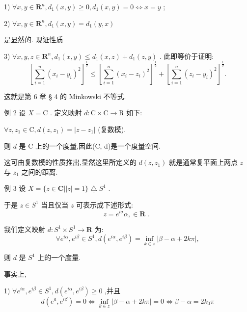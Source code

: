 1) $\forall x,y \in  {\mathbf{R}}^{n},{d}_{1}\left( {x,y}\right)  \geq  0,{d}_{1}\left( {x,y}\right)  = 0 \Leftrightarrow  x = y$ ;

2) $\forall x,y \in  {\mathbf{R}}^{n},{d}_{1}\left( {x,y}\right)  = {d}_{1}\left( {y,x}\right)$

是显然的. 现证性质

3) $\forall x,y,z \in  {\mathbf{R}}^{n},{d}_{1}\left( {x,y}\right)  \leq  {d}_{1}\left( {x,z}\right)  + {d}_{1}\left( {z,y}\right)$ . 此即等价于证明:
$${\left\lbrack  \mathop{\sum }\limits_{{i = 1}}^{n}{\left( {x}_{i} - {y}_{i}\right) }^{2}\right\rbrack  }^{\frac{1}{2}} \leq  {\left\lbrack  \mathop{\sum }\limits_{{i = 1}}^{n}{\left( {x}_{i} - {z}_{i}\right) }^{2}\right\rbrack  }^{\frac{1}{2}} + {\left\lbrack  \mathop{\sum }\limits_{{i = 1}}^{n}{\left( {z}_{i} - {y}_{i}\right) }^{2}\right\rbrack  }^{\frac{1}{2}}.$$

这就是第 6 章 § 4 的 Minkowski 不等式.

例 2 设 $X = \mathrm{C}$ . 定义映射 $d : \mathrm{C} \times  \mathrm{C} \rightarrow  \mathrm{R}$ 如下:

$\forall z,{z}_{1} \in  \mathrm{C},d\left( {z,{z}_{1}}\right)  = \left| {z - {z}_{1}}\right|$ (复数模).

则 $d$ 是 $\mathrm{C}$ 上的一个度量,因此(C, d)是一个度量空间.

这可由复数模的性质推出,显然这里所定义的 $d\left( {z,{z}_{1}}\right)$ 就是通常复平面上两点 $z$ 与 ${z}_{1}$ 之间的距离.

例 3 设 $X = \{ z \in  \mathbf{C}\left| \right| z \mid   = 1\} \underline{ \bigtriangleup  }{S}^{1}$ .

于是 $z \in  {S}^{1}$ 当且仅当 $z$ 可表示成下述形式:
$$z = {e}^{i\sigma }\alpha , \in  \mathbf{R}\text{ . }$$

我们定义映射 $d : {S}^{1} \times  {S}^{1} \rightarrow  \mathbf{R}$ 为:
$$\forall {e}^{i\alpha },{e}^{i\beta } \in  {S}^{1},d\left( {{e}^{i\alpha },{e}^{i\beta }}\right)  = \mathop{\inf }\limits_{{k \in  z}}\left| {\beta  - \alpha  + {2k\pi }}\right| ,$$

则 $d$ 是 ${S}^{1}$ 上的一个度量.

事实上,

1) $\forall {e}^{i\alpha },{e}^{i\beta } \in  {S}^{1},d\left( {{e}^{i\alpha },{e}^{i\beta }}\right)  \geq  0$ ,并且
$$d\left( {{e}^{a},{e}^{\iota \beta }}\right)  = 0 \Leftrightarrow  \mathop{\inf }\limits_{{k \in  z}}\left| {\beta  - \alpha  + {2k\pi }}\right|  = 0 \Leftrightarrow  \beta  - \alpha  = 2{k}_{0}\pi$$

